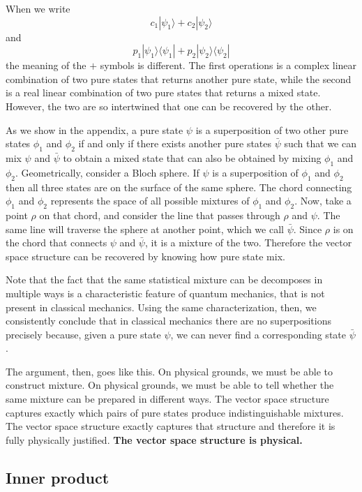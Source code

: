 \documentclass[10pt,twocolumn, nofootinbib]{revtex4-2}
\def\>{\rangle}
\def\<{\langle}
\begin{document}
When we write
$$c_1|\psi_1\> + c_2 |\psi_2\>$$
and 
$$p_1|\psi_1\>\<\psi_1| + p_2|\psi_2\>\<\psi_2|$$
the meaning of the $+$ symbols is different. The first operations is a complex linear combination of two pure states that returns another pure state, while the second is a real linear combination of two pure states that returns a mixed state. However, the two are so intertwined that one can be recovered by the other.

As we show in the appendix, a pure state $\psi$ is a superposition of two other pure states $\phi_1$ and $\phi_2$ if and only if there exists another pure states $\bar{\psi}$ such that we can mix $\psi$ and $\bar{\psi}$ to obtain a mixed state that can also be obtained by mixing $\phi_1$ and $\phi_2$. Geometrically, consider a Bloch sphere. If $\psi$ is a superposition of $\phi_1$ and $\phi_2$ then all three states are on the surface of the same sphere. The chord connecting $\phi_1$ and $\phi_2$ represents the space of all possible mixtures of $\phi_1$ and $\phi_2$. Now, take a point $\rho$ on that chord, and consider the line that passes through $\rho$ and $\psi$. The same line will traverse the sphere at another point, which we call $\bar{\psi}$. Since $\rho$ is on the chord that connects $\psi$ and  $\bar{\psi}$, it is a mixture of the two. Therefore the vector space structure can be recovered by knowing how pure state mix.

Note that the fact that the same statistical mixture can be decomposes in multiple ways is a characteristic feature of quantum mechanics, that is not present in classical mechanics. Using the same characterization, then, we consistently conclude that in classical mechanics there are no superpositions precisely because, given a pure state $\psi$, we can never find a corresponding state $\bar{\psi}$.

The argument, then, goes like this. On physical grounds, we must be able to construct mixture. On physical grounds, we must be able to tell whether the same mixture can be prepared in different ways. The vector space structure captures exactly which pairs of pure states produce indistinguishable mixtures. The vector space structure exactly captures that structure and therefore it is fully physically justified. \textbf{The vector space structure is physical.}

\subsection{Inner product}
\end{document}
